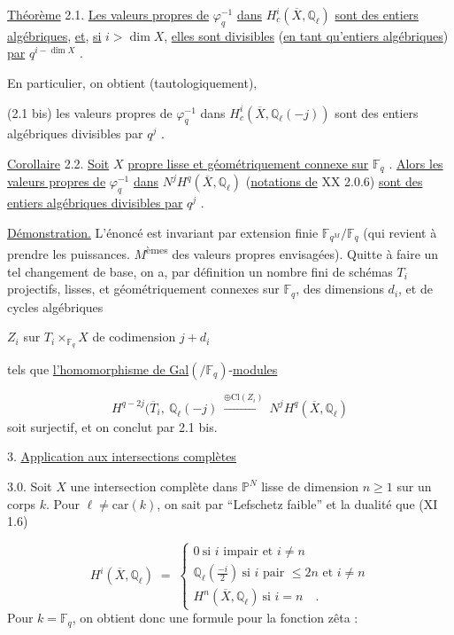 \underline{Théorème} 2.1. \underline{Les valeurs propres de} $\varphi_q^{-1}$ \underline{dans} $H^i_c(\overline{X},\mathbb{Q}_\ell)$ \underline{sont des entiers algébriques}, \underline{et}, \underline{si} $i > \dim X$, \underline{elles sont divisibles} (\underline{en tant qu'entiers algébriques}) \underline{par} $q^{i-\dim X}$ .



En particulier, on obtient (tautologiquement),

(2.1 bis) \quad les valeurs propres de $\varphi_q^{-1}$ dans $H^i_c(\overline{X},\mathbb{Q}_\ell(-j))$ sont des entiers algébriques divisibles par $q^j$ .

\underline{Corollaire} 2.2. \underline{Soit} $X$ \underline{propre lisse et géométriquement connexe sur} $\mathbb{F}_q$ . \underline{Alors les valeurs propres de} $\varphi_q^{-1}$ \underline{dans} $N^jH^q(\overline{X},\mathbb{Q}_\ell)$ (\underline{notations de} XX 2.0.6) \underline{sont des entiers algébriques divisibles par} $q^j$ .

\underline{Démonstration.} L'énoncé est invariant par extension finie $\mathbb{F}_{q^M}/\mathbb{F}_q$ (qui revient à prendre les puissances. $M$\textsuperscript{èmes} des valeurs propres envisagées). Quitte à faire un tel changement de base, on a, par définition un nombre fini de schémas $T_i$ projectifs, lisses, et géométriquement connexes sur $\mathbb{F}_q$, des dimensions $d_i$, et de cycles algébriques

$Z_i$ sur $T_i \times_{\mathbb{F}_q} X$ de codimension $j + d_i$

tels que \underline{l'homomorphisme de Gal}$(/\mathbb{F}_q)$-\underline{modules}

\begin{equation*}
H^{q-2j}(\overline{T}_i,\ \mathbb{Q}_\ell(-j) \ \stackrel{\oplus \mathrm{Cl}(Z_i)}{\longrightarrow} \ N^jH^q(\overline{X},\mathbb{Q}_\ell)
\end{equation*}
soit surjectif, et on conclut par 2.1 bis.




3. \underline{Application aux intersections complètes}

3.0. Soit $X$ une intersection complète dans $\mathbb{P}^N$ lisse de dimension $n \geq 1$ sur un corps $k$. Pour $\ell \neq \mathrm{car}(k)$, on sait par ``Lefschetz faible'' et la dualité que (XI 1.6)

\begin{equation}\tag{3.0.1}
H^i(\overline{X},\mathbb{Q}_\ell) \;=\; \left\{ \begin{array}{l} 0 \ \mbox{si $i$ impair et $i \neq n$} \\[1.5ex] \mathbb{Q}_\ell\!\left(\frac{-i}{2}\right) \ \mbox{si $i$ pair $\leq 2n$ et $i \neq n$} \\[1.5ex] H^n(\overline{X},\mathbb{Q}_\ell) \ \mbox{si $i=n$} \quad . \end{array} \right.
\end{equation}
Pour $k = \mathbb{F}_q$, on obtient donc une formule pour la fonction zêta :


